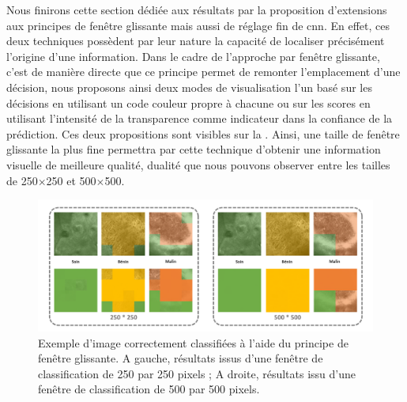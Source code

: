 Nous finirons cette section dédiée aux résultats par la proposition d'extensions aux principes de fenêtre glissante mais aussi de réglage fin de \gls{cnn}. En effet, ces deux techniques possèdent par leur nature la capacité de localiser précisément l'origine d'une information. Dans le cadre de l'approche par fenêtre glissante, c'est de manière directe que ce principe permet de remonter l'emplacement d'une décision, nous proposons ainsi deux modes de visualisation l'un basé sur les décisions en utilisant un code couleur propre à chacune ou sur les scores en utilisant l'intensité de la transparence comme indicateur dans la confiance de la prédiction. Ces deux propositions sont visibles sur la . Ainsi, une taille de fenêtre glissante la plus fine permettra par cette technique d'obtenir une information visuelle de meilleure qualité, dualité que nous pouvons observer entre les tailles de 250$\times$250 et 500$\times$500.\par

\begin{figure}[H]
    \centering
    \includegraphics[width=\linewidth]{contents/chapter_5/resources/exemple_image_improvement_well.pdf}
    \caption{Exemple d'image correctement classifiées à l'aide du principe de fenêtre glissante. A gauche, résultats issus d'une fenêtre de classification de 250 par 250 pixels ; A droite, résultats issu d'une fenêtre de classification de 500 par 500 pixels.}
    \label{fig:exemple_image_improvement_well}
\end{figure}\par

